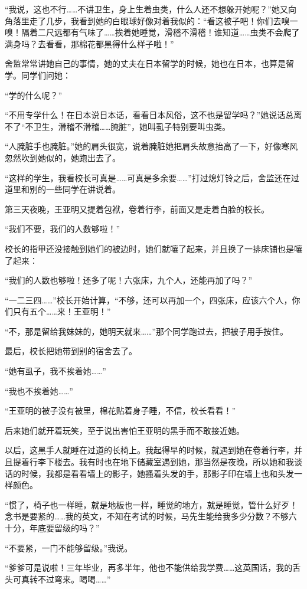 \par “我说，这也不行……不讲卫生，身上生着虫类，什么人还不想躲开她呢？”她又向角落里走了几步，我看到她的白眼球好像对着我似的：“看这被子吧！你们去嗅一嗅！隔着二尺远都有气味了……挨着她睡觉，滑稽不滑稽！谁知道……虫类不会爬了满身吗？去看看，那棉花都黑得什么样子啦！”
\par 舍监常常讲她自己的事情，她的丈夫在日本留学的时候，她也在日本，也算是留学。同学们问她：
\par “学的什么呢？”
\par “不用专学什么！在日本说日本话，看看日本风俗，这不也是留学吗？”她说话总离不了“不卫生，滑稽不滑稽……腌脏”，她叫虱子特别要叫虫类。
\par “人腌脏手也腌脏。”她的肩头很宽，说着腌脏她把肩头故意抬高了一下，好像寒风忽然吹到她似的，她跑出去了。
\par “这样的学生，我看校长可真是……可真是多余要……”打过熄灯铃之后，舍监还在过道里和别的一些同学在讲说着。
\par 第三天夜晚，王亚明又提着包袱，卷着行李，前面又是走着白脸的校长。
\par “我们不要，我们的人数够啦！”
\par 校长的指甲还没接触到她们的被边时，她们就嚷了起来，并且换了一排床铺也是嚷了起来：
\par “我们的人数也够啦！还多了呢！六张床，九个人，还能再加了吗？”
\par “一二三四……”校长开始计算，“不够，还可以再加一个，四张床，应该六个人，你们只有五个……来！王亚明！”
\par “不，那是留给我妹妹的，她明天就来……”那个同学跑过去，把被子用手按住。
\par 最后，校长把她带到别的宿舍去了。
\par “她有虱子，我不挨着她……”
\par “我也不挨着她……”
\par “王亚明的被子没有被里，棉花贴着身子睡，不信，校长看看！”
\par 后来她们就开着玩笑，至于说出害怕王亚明的黑手而不敢接近她。
\par 以后，这黑手人就睡在过道的长椅上。我起得早的时候，就遇到她在卷着行李，并且提着行李下楼去。我有时也在地下储藏室遇到她，那当然是夜晚，所以她和我谈话的时候，我都是看看墙上的影子，她搔着头发的手，那影子印在墙上也和头发一样颜色。
\par “惯了，椅子也一样睡，就是地板也一样，睡觉的地方，就是睡觉，管什么好歹！念书是要紧的……我的英文，不知在考试的时候，马先生能给我多少分数？不够六十分，年底要留级的吗？”
\par “不要紧，一门不能够留级。”我说。
\par “爹爹可是说啦！三年毕业，再多半年，他也不能供给我学费……这英国话，我的舌头可真转不过弯来。喝喝……”
